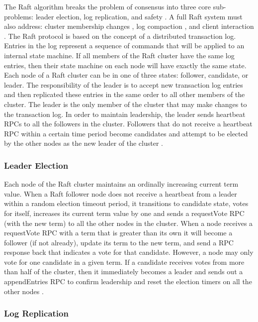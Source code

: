 \documentclass[9pt]{extarticle}
\begin{document}
\begin{multicols}{2}
The Raft algorithm breaks the problem of consensus into three core
sub-problems: leader election, log replication, and safety
\cite[Section~3]{raft_thesis:ongaro14}. A full Raft system must also
address: cluster membership changes
\cite[Section~4]{raft_thesis:ongaro14}, log compaction
\cite[Section~5]{raft_thesis:ongaro14}, and client
interaction \cite[Section~6]{raft_thesis:ongaro14}. The Raft protocol
is based on the concept of a distributed transaction log. Entries in
the log represent a sequence of commands that will be applied to an
internal state machine. If all members of the Raft cluster have the
same log entries, then their state machine on each node will have
exactly the same state. Each node of a Raft cluster can be in one of
three states: follower, candidate, or leader. The responsibility of
the leader is to accept new transaction log entries and then
replicated these entries in the same order to all other members of the
cluster. The leader is the only member of the cluster that may make
changes to the transaction log. In order to maintain leadership, the
leader sends heartbeat RPCs to all the followers in the cluster.
Followers that do not receive a heartbeat RPC within a certain time
period become candidates and attempt to be elected by the other nodes
as the new leader of the cluster \cite[p.~12]{raft_thesis:ongaro14}.

\subsubsection{Leader Election}

Each node of the Raft cluster maintains an ordinally increasing
current term value. When a Raft follower node does not receive
a heartbeat from a leader within a random election timeout period, it
transitions to candidate state, votes for itself, increases its
current term value by one and sends a requestVote RPC (with the
new term) to all the other nodes in the cluster. When a node receives
a requestVote RPC with a term that is greater than its own it will
become a follower (if not already), update its term to the new term,
and send a RPC response back that indicates a vote for that candidate.
However, a node may only vote for one candidate in a given term. If
a candidate receives votes from more than half of the cluster, then it
immediately becomes a leader and sends out a appendEntries RPC to
confirm leadership and reset the election timers on all the other
nodes \cite[Section~3.4]{raft_thesis:ongaro14}.

\subsubsection{Log Replication}


\end{multicols}
\end{document}

